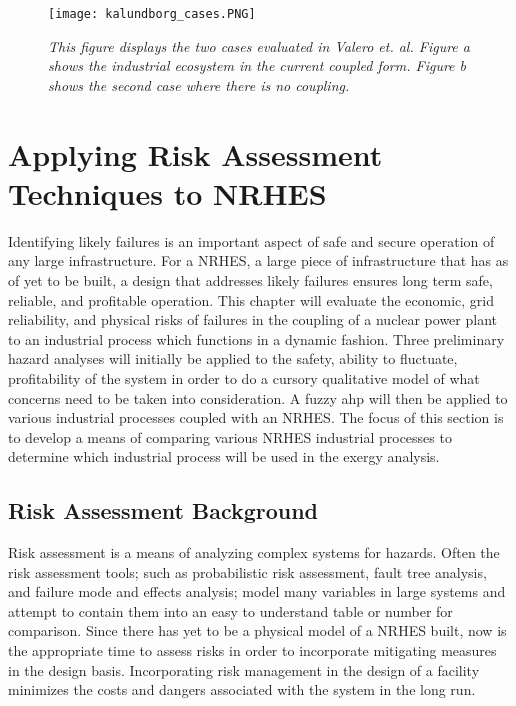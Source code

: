 \documentclass[12pt]{UIdahoMastersThesis}
\begin{document}
\begin{figure}
\centering
\texttt{[image: kalundborg\_cases.PNG]}
\caption{\small \sl This figure displays the two cases evaluated in Valero et. al. Figure a shows the industrial ecosystem in the current coupled form. Figure b shows the second case where there is no coupling.}
\end{figure}


\chapter{Applying Risk Assessment Techniques to NRHES}
Identifying likely failures is an important aspect of safe and secure operation of any large infrastructure. For a NRHES, a large piece of infrastructure that has as of yet to be built, a design that addresses likely failures ensures long term safe, reliable, and profitable operation. This chapter will evaluate the economic, grid reliability, and physical risks of failures in the coupling of a nuclear power plant to an industrial process which functions in a dynamic fashion. Three preliminary hazard analyses will initially be applied to the safety, ability to fluctuate, profitability of the system in order to do a cursory qualitative model of what concerns need to be taken into consideration. A fuzzy \ac{ahp} will then be applied to various industrial processes coupled with an NRHES. The focus of this section is to develop a means of comparing various NRHES industrial processes to determine which industrial process will be used in the exergy analysis.
\section{Risk Assessment Background}
Risk assessment is a means of analyzing complex systems for hazards. Often the risk assessment tools; such as probabilistic risk assessment, fault tree analysis, and failure mode and effects analysis; model many variables in large systems and attempt to contain them into an easy to understand table or number for comparison. Since there has yet to be a physical model of a NRHES built, now is the appropriate time to assess risks in order to incorporate mitigating measures in the design basis. Incorporating risk management in the design of a facility minimizes the costs and dangers associated with the system in the long run.
\end{document}
